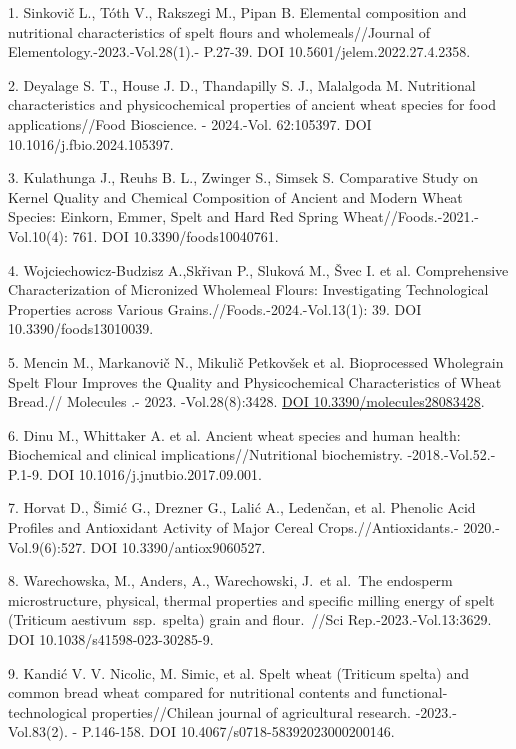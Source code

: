 \begin{refs}
1. Sinkovič L., Tóth V., Rakszegi M., Pipan B. Elemental composition and
nutritional characteristics of spelt flours and wholemeals//Journal of
Elementology.-2023.-Vol.28(1).- P.27-39. DOI
10.5601/jelem.2022.27.4.2358.

2. Deyalage S. T., House J. D., Thandapilly S. J., Malalgoda M.
Nutritional characteristics and physicochemical properties of ancient
wheat species for food applications//Food Bioscience. - 2024.-Vol.
62:105397. DOI 10.1016/j.fbio.2024.105397.

3. Kulathunga J., Reuhs B. L., Zwinger S., Simsek S. Comparative Study
on Kernel Quality and Chemical Composition of Ancient and Modern Wheat
Species: Einkorn, Emmer, Spelt and Hard Red Spring
Wheat//Foods.-2021.-Vol.10(4): 761. DOI 10.3390/foods10040761.

4. Wojciechowicz-Budzisz A.,Skřivan P., Sluková M., Švec I. et al.
Comprehensive Characterization of Micronized Wholemeal Flours:
Investigating Technological Properties across Various
Grains.//Foods.-2024.-Vol.13(1): 39. DOI 10.3390/foods13010039.

5. Mencin M., Markanovič N., Mikulič Petkovšek et al. Bioprocessed
Wholegrain Spelt Flour Improves the Quality and Physicochemical
Characteristics of Wheat Bread.// Molecules .- 2023.
-Vol.28(8):3428.
\href{https://doi.org/10.3390/molecules28083428}{DOI
10.3390/molecules28083428}.

6. Dinu M., Whittaker A. et al. Ancient wheat species and human health:
Biochemical and clinical implications//Nutritional biochemistry.
-2018.-Vol.52.-P.1-9. DOI 10.1016/j.jnutbio.2017.09.001.

7. Horvat D., Šimić G., Drezner G., Lalić A., Ledenčan, et al. Phenolic
Acid Profiles and Antioxidant Activity of Major Cereal
Crops.//Antioxidants.- 2020.-Vol.9(6):527. DOI
10.3390/antiox9060527.

8. Warechowska, M., Anders, A., Warechowski, J.~et al.~The endosperm
microstructure, physical, thermal properties and specific milling energy
of spelt (Triticum aestivum~ssp.~spelta) grain and flour.~//Sci
Rep.-2023.-Vol.13:3629. DOI 10.1038/s41598-023-30285-9.

9. Kandić V. V. Nicolic, M. Simic, et al.
Spelt wheat (Triticum spelta) and common bread wheat compared for
nutritional contents and functional-technological properties//Chilean
journal of agricultural research. -2023.-Vol.83(2). - P.146-158. DOI
10.4067/s0718-58392023000200146.


\end{refs}
